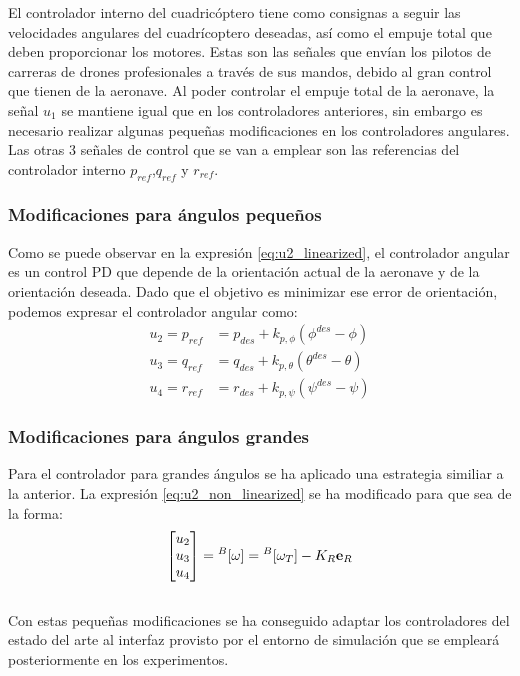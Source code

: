 
El controlador interno del cuadricóptero tiene como consignas a seguir las velocidades angulares del cuadrícoptero deseadas, así como el empuje total que deben proporcionar los motores. Estas son las señales que envían los pilotos de carreras de drones profesionales a través de sus mandos, debido al gran control que tienen de la aeronave. Al poder controlar el empuje total de la aeronave, la señal $u_1$ se mantiene igual que en los controladores anteriores, sin embargo es necesario realizar algunas pequeñas modificaciones en los controladores angulares. Las otras 3 señales de control que se van a emplear son las referencias del controlador interno $p_{ref}$,$q_{ref}$ y $r_{ref}$.

\subsubsection{Modificaciones para ángulos pequeños}
Como se puede observar en la expresión \ref{eq:u2_linearized},  el controlador angular es un control PD que depende de la orientación actual de la aeronave y de la orientación deseada. Dado que el objetivo es minimizar ese error de orientación, podemos expresar el controlador angular como:
\begin{align}
	u_2 = p_{ref} &=  p_{des} + k_{p,\phi}(\phi^{des}-\phi)\\
	u_3 = q_{ref} &=  q_{des} + k_{p,\theta}(\theta^{des}-\theta)\\
	u_4 = r_{ref} &=  r_{des} + k_{p,\psi}(\psi^{des}-\psi)
\end{align}


\subsubsection{Modificaciones para ángulos grandes}
Para el controlador para grandes ángulos se ha aplicado una estrategia similiar a la anterior. La expresión \ref{eq:u2_non_linearized} se ha modificado para que sea de la forma:
\begin{equation}
	\begin{bmatrix}
		u_{2}\\u_{3}\\u_{4} 
	\end{bmatrix}=\null^B[\omega] =  \null^B[\omega_T]    -K_R	\mathbf{e}_R  
\end{equation}
\\

Con estas pequeñas modificaciones se ha conseguido adaptar los controladores del estado del arte al interfaz provisto por el entorno de simulación que se empleará posteriormente en los experimentos.


